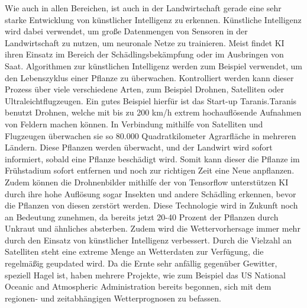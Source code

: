 Wie auch in allen Bereichen, ist auch in der Landwirtschaft gerade eine sehr
starke Entwicklung von künstlicher Intelligenz zu erkennen. Künstliche
Intelligenz wird dabei verwendet, um große Datenmengen von Sensoren in der
Landwirtschaft zu nutzen, um neuronale Netze zu trainieren. Meist findet KI
ihren Einsatz im Bereich der Schädlingsbekämpfung oder im Ausbringen von
Saat.\cite{mci/Mohr2020} Algorithmen zur künstlichen Intelligenz werden zum
Beispiel verwendet, um den Lebenszyklus einer Pflanze zu überwachen.
Kontrolliert werden kann dieser Prozess über viele verschiedene Arten, zum
Beispiel Drohnen, Satelliten oder Ultraleichtflugzeugen. Ein gutes Beispiel
hierfür ist das Start-up Taranis.Taranis benutzt Drohnen, welche mit bis zu
200 km/h extrem hochauflösende Aufnahmen von Feldern machen können. In
Verbindung mithilfe von Satelliten und Flugzeugen überwachen sie so 80.000
Quadratkilometer Agrarfläche in mehreren Ländern. Diese Pflanzen werden
überwacht, und der Landwirt wird sofort informiert, sobald eine Pflanze
beschädigt wird. Somit kann dieser die Pflanze im Frühstadium sofort entfernen
und noch zur richtigen Zeit eine Neue anpflanzen. Zudem können die
Drohnenbilder mithilfe der von Tensorflow unterstützen KI durch ihre hohe
Auflösung sogar Insekten und andere Schädling erkennen, bevor die Pflanzen von
diesen zerstört werden. Diese Technologie wird in Zukunft noch an Bedeutung
zunehmen, da bereits jetzt 20-40 Prozent der Pflanzen durch Unkraut und
ähnliches absterben. Zudem wird die Wettervorhersage immer mehr durch den
Einsatz von künstlicher Intelligenz verbessert. Durch die Vielzahl an
Satelliten steht eine extreme Menge an Wetterdaten zur Verfügung, die
regelmäßig geupdated wird. Da die Ernte sehr anfällig gegenüber Gewitter,
speziell Hagel ist, haben mehrere Projekte, wie zum Beispiel das US National
Oceanic and Atmospheric Administration bereits begonnen, sich mit dem regionen-
und zeitabhängigen Wetterprognosen zu befassen.\cite{wennker2020kunstliche}